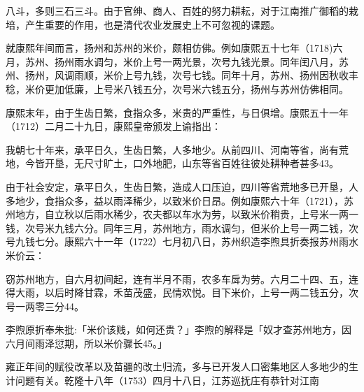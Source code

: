 \vfill
\begin{BookNotes}
\end{BookNotes}

\noindent 八斗，多则三石三斗。由于官绅、商人、百姓的努力耕耘，对于江南推广御稻的栽培，产生重要的作用，也是清代农业发展史上不可忽视的课题。

就康熙年间而言，扬州和苏州的米价，颇相仿佛。例如康熙五十七年（1718)六月，苏州、扬州雨水调匀，米价上号一两光景，次号九钱光景。同年闰八月，苏州、扬州，风调雨顺，米价上号九钱，次号七钱。同年十月，苏州、扬州因秋收丰稔，米价更加低廉，上号米八钱五分，次号米六钱五分，扬州与苏州仿佛相同。

康熙末年，由于生齿日繁，食指众多，米贵的严重性，与日俱增。康熙五十一年（1712）二月二十九日，康熙皇帝颁发上谕指出：

\begin{BookQuote}
我朝七十年来，承平日久，生齿日繁，人多地少。从前四川、河南等省，尚有荒地，今皆开垦，无尺寸旷土，口外地肥，山东等省百姓往彼处耕种者甚多43。
\end{BookQuote}

由于社会安定，承平日久，生齿日繁，造成人口压迫，四川等省荒地多已开垦，人多地少，食指众多，益以雨泽稀少，以致米价日昂。例如康熙六十年（1721），苏州地方，自立秋以后雨水稀少，农夫都以车水为劳，以致米价稍贵，上号米一两一钱，次号米九钱六分。同年三月，苏州地方，雨水调匀，但米价上号一两二钱，次号九钱七分。康熙六十一年（1722）七月初八日，苏州织造李煦具折奏报苏州雨水米价云：

\begin{BookQuote}
窃苏州地方，自六月初间起，连有半月不雨，农多车戽为劳。六月二十四、五，连得大雨，以后时降甘霖，禾苗茂盛，民情欢悦。目下米价，上号一两二钱五分，次号一两零三分44。
\end{BookQuote}

李煦原折奉朱批:「米价该贱，如何还贵？」李煦的解释是「奴才查苏州地方，因六月间雨泽愆期，所以米价骤长45。」

雍正年间的赋役改革以及苗疆的改土归流，多与已开发人口密集地区人多地少的生计问题有关。乾隆十八年（1753）四月十八日，江苏巡抚庄有恭针对江南

\vfill
\begin{BookNotes}
\end{BookNotes}

